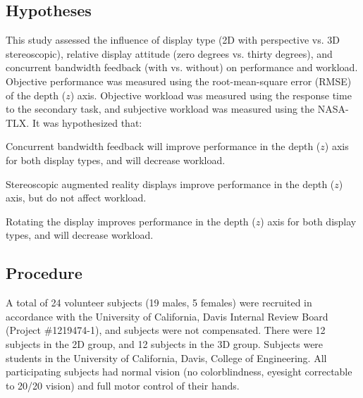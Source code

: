 \subsection{Hypotheses}
This study assessed the influence of display type (2D with perspective vs. 3D stereoscopic), relative display attitude (zero degrees vs. thirty degrees), and concurrent bandwidth feedback (with vs. without) on performance and workload.
Objective performance was measured using the root-mean-square error (RMSE) of the depth ($z$) axis.
Objective workload was measured using the response time to the secondary task, and subjective workload was measured using the NASA-TLX.
It was hypothesized that:
\begin{description}[align=left]
    \item [Hypothesis 1] Concurrent bandwidth feedback will improve performance in the depth ($z$) axis for both display types, and will decrease workload.
    \item [Hypothesis 2] Stereoscopic augmented reality displays improve performance in the depth ($z$) axis, but do not affect workload.
    \item [Hypothesis 3] Rotating the display improves performance in the depth ($z$) axis for both display types, and will decrease workload.
\end{description}

\subsection{Procedure}
A total of 24 volunteer subjects (19 males, 5 females) were recruited in accordance with the University of California, Davis Internal Review Board (Project \#1219474-1), and subjects were not compensated.
There were 12 subjects in the 2D group, and 12 subjects in the 3D group.
Subjects were students in the University of California, Davis, College of Engineering.
All participating subjects had normal vision (no colorblindness, eyesight correctable to 20/20 vision) and full motor control of their hands.

